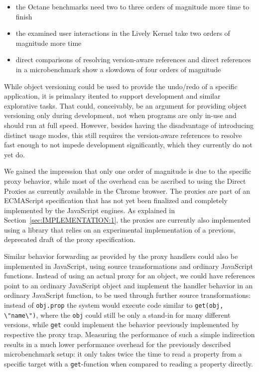\begin{itemize}
    \item the Octane benchmarks need two to three orders of magnitude more time to finish
    \item the examined user interactions in the Lively Kernel take two orders of magnitude more time
    \item direct comparisons of resolving version-aware references and direct references in a microbenchmark show a slowdown of four orders of magnitude
\end{itemize}

While object versioning could be used to provide the undo/redo of a specific application, it is primalary itented to support development and similar explorative tasks.
That could, conceivably, be an argument for providing object versioning only during development, not when programs are only in-use and should run at full speed.
However, besides having the disadvantage of introducing distinct usage modes, this still requires the version-aware references to resolve fast enough to not impede development significantly, which they currently do not yet do.

We gained the impression that only one order of magnitude is due to the specific proxy behavior, while most of the overhead can be ascribed to using the Direct Proxies as currently available in the Chrome browser.
The proxies are part of an ECMAScript specification that has not yet been finalized and completely implemented by the JavaScript engines.
As explained in Section~\ref{sec:IMPLEMENTATION:1}, the proxies are currently also implemented using a library that relies on an experimental implementation of a previous, deprecated draft of the proxy specification.

Similar behavior forwarding as provided by the proxy handlers could also be implemented in JavaScript, using source transformations and ordinary JavaScript functions.
Instead of using an actual proxy for an object, we could have references point to an ordinary JavaScript object and implement the handler behavior in an ordinary JavaScript function, to be used through further source transformations: instead of \lstinline{obj.prop} the system would execute code similar to \lstinline{get(obj, \"name\")}, where the \lstinline{obj} could still be only a stand-in for many different versions, while \lstinline{get} could implement the behavior previously implemented by respective the proxy trap.
Measuring the performance of such a simple indirection results in a much lower performance overhead for the previously described microbenchmark setup:
it only takes twice the time to read a property from a specific target with a \lstinline{get}-function when compared to reading a property directly.

